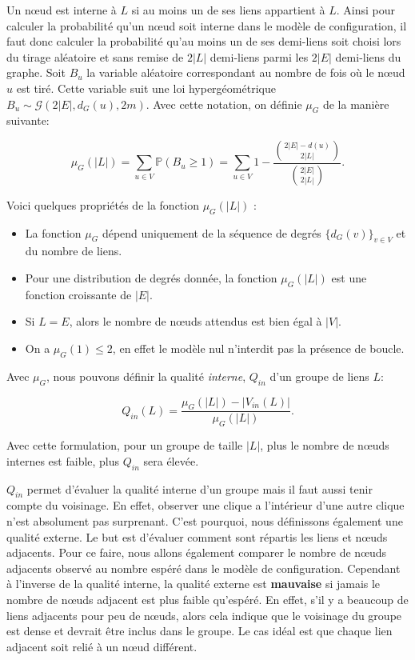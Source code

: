 Un n\oe ud est interne à $L$ si au moins un de ses liens appartient à $L$.
Ainsi pour calculer la probabilité qu'un n\oe ud soit interne dans le modèle de configuration, il faut donc calculer la probabilité qu'au moins un de ses demi-liens soit choisi lors du tirage aléatoire et sans remise de $2|L|$ demi-liens parmi les $2|E|$ demi-liens du graphe.
Soit $B_u$ la variable aléatoire correspondant au nombre de fois où le n\oe ud $u$ est tiré.
Cette variable suit une loi  hypergéométrique $B_u \sim \mathcal{G}\left(2|E|,d_G(u),2m\right)$.
Avec cette notation, on définie $\mu_G$ de la manière suivante:

\begin{equation}
\label{eq:nbsommet_esp} \mu_{G}(|L|) = \sum_{u\in V} \mathbb{P}( B_u \geq 1 )
=  \sum_{u \in V} 1 - \dfrac{ \binom{2|E|-d(u)}{2|L|} }{ \binom{2|E|}{2|L|} }. 
\end{equation}

Voici quelques propriétés de la fonction $\mu_{G}(|L|)$ :
\begin{itemize}
\item La fonction $\mu_{G}$ dépend uniquement de la séquence de degrés $\{d_G(v)\}_{v \in V}$ et du nombre de liens.
\item Pour une distribution de degrés donnée, la fonction   $\mu_{G}(|L|)$ est une fonction croissante de $|E|$.
\item Si $L=E$, alors le nombre de n\oe uds attendus est bien égal à $|V|$.
\item On a $\mu_{G}(1)\leq 2$, en effet le modèle nul n'interdit pas la présence de boucle.
\end{itemize}

Avec $\mu_G$, nous pouvons définir la qualité \emph{interne}, $Q_{in}$ d'un groupe de liens $L$:
  
\begin{equation}
\label{eq:qin} Q_{in}(L) = \dfrac{\mu_{G}(|L|) - |V_{in}(L)|}{\mu_{G}(|L|)}.
\end{equation}

Avec cette formulation, pour un groupe de taille $|L|$, plus le nombre de n\oe uds internes est faible, plus $Q_{in}$ sera élevée.

$Q_{in}$ permet d'évaluer la qualité interne d'un groupe mais il faut aussi tenir compte du voisinage.
En effet, observer une clique a l'intérieur d'une autre clique n'est absolument pas surprenant.
C'est pourquoi, nous définissons également une qualité externe.
Le but est d'évaluer comment sont répartis les liens et n\oe uds adjacents.
Pour ce faire, nous allons également comparer le nombre de n\oe uds adjacents observé au nombre espéré dans le modèle de configuration.
Cependant à l'inverse de la qualité interne, la qualité externe est \textbf{mauvaise} si jamais le nombre de n\oe uds adjacent est plus faible qu'espéré.
En effet, s'il y a beaucoup de liens adjacents pour peu de n\oe uds, alors cela indique que le voisinage du groupe est dense et devrait être inclus dans le groupe.
Le cas idéal est que chaque lien adjacent soit relié à un n\oe ud différent.

